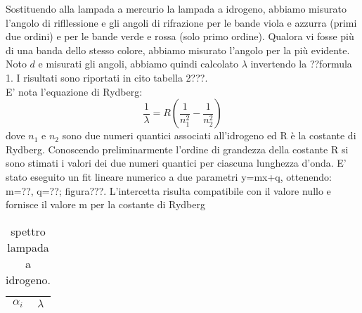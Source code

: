 Sostituendo alla lampada a mercurio la lampada a idrogeno, abbiamo misurato l'angolo di rifllessione e gli angoli di rifrazione per le bande viola e azzurra (primi due ordini) e per le bande verde e rossa (solo primo ordine). Qualora vi fosse più di una banda dello stesso colore, abbiamo misurato l'angolo per la più evidente. Noto $d$ e misurati gli angoli, abbiamo quindi calcolato $\lambda$ invertendo la ??formula 1. I risultati sono riportati in cito tabella 2???.\\

E' nota l'equazione di Rydberg:
\begin{equation}
\frac{1}{\lambda} = R (\frac{1}{n_{1}^2} - \frac{1}{n_{2}^2})
\end{equation} dove $n_1$ e $n_2$  sono due numeri quantici associati all'idrogeno ed R è la costante di Rydberg. Conoscendo preliminarmente l'ordine di grandezza della costante R si sono stimati i valori dei due numeri quantici per ciascuna lunghezza d'onda. E' stato eseguito un fit lineare numerico a due parametri y=mx+q, ottenendo: m=??, q=??; figura???.
L'intercetta risulta compatibile con il valore nullo e fornisce il valore m per la costante di Rydberg

\begin{table}[h]
\begin{center}
\begin{tabular}{| r @{$\pm$} l  @{ Rad } | r @{$\pm$} l  @{\quad nm } |}

\hline
\multicolumn{2}{c|}{$\alpha_{i}$} & \multicolumn{2}{c|}{$\lambda$} \\
\hline

\hline
\end{tabular}
\caption{spettro lampada a idrogeno.}
\end{center}
\end{table}
